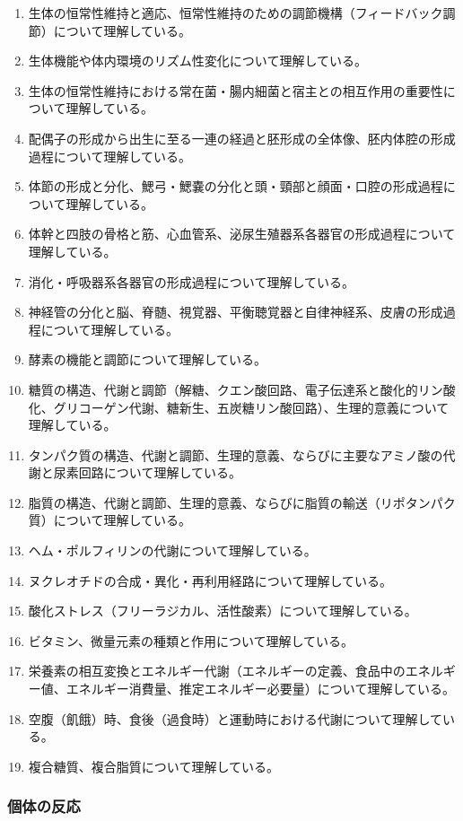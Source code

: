 \begin{enumerate}
\item
  生体の恒常性維持と適応、恒常性維持のための調節機構（フィードバック調節）について理解している。
\item
  生体機能や体内環境のリズム性変化について理解している。
\item
  生体の恒常性維持における常在菌・腸内細菌と宿主との相互作用の重要性について理解している。
\item
  配偶子の形成から出生に至る一連の経過と胚形成の全体像、胚内体腔の形成過程について理解している。
\item
  体節の形成と分化、鰓弓・鰓嚢の分化と頭・頸部と顔面・口腔の形成過程について理解している。
\item
  体幹と四肢の骨格と筋、心血管系、泌尿生殖器系各器官の形成過程について理解している。
\item
  消化・呼吸器系各器官の形成過程について理解している。
\item
  神経管の分化と脳、脊髄、視覚器、平衡聴覚器と自律神経系、皮膚の形成過程について理解している。
\item
  酵素の機能と調節について理解している。
\item
  糖質の構造、代謝と調節（解糖、クエン酸回路、電子伝達系と酸化的リン酸化、グリコーゲン代謝、糖新生、五炭糖リン酸回路）、生理的意義について理解している。
\item
  タンパク質の構造、代謝と調節、生理的意義、ならびに主要なアミノ酸の代謝と尿素回路について理解している。
\item
  脂質の構造、代謝と調節、生理的意義、ならびに脂質の輸送（リポタンパク質）について理解している。
\item
  ヘム・ポルフィリンの代謝について理解している。
\item
  ヌクレオチドの合成・異化・再利用経路について理解している。
\item
  酸化ストレス（フリーラジカル、活性酸素）について理解している。
\item
  ビタミン、微量元素の種類と作用について理解している。
\item
  栄養素の相互変換とエネルギー代謝（エネルギーの定義、食品中のエネルギー値、エネルギー消費量、推定エネルギー必要量）について理解している。
\item
  空腹（飢餓）時、食後（過食時）と運動時における代謝について理解している。
\item
  複合糖質、複合脂質について理解している。
\end{enumerate}

\hypertarget{ux500bux4f53ux306eux53cdux5fdc}{%
\subsubsection{個体の反応}\label{ux500bux4f53ux306eux53cdux5fdc}}

